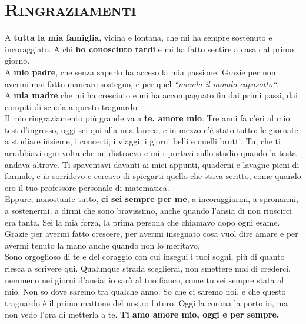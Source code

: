 \chapter*{\scshape Ringraziamenti}

\noindent A \textbf{tutta la mia famiglia}, vicina e lontana, che mi ha sempre sostenuto e incoraggiato. A chi \textbf{ho conosciuto tardi} e mi ha fatto sentire a casa dal primo giorno.\\

\medskip
\noindent A \textbf{mio padre}, che senza saperlo ha acceso la mia passione. Grazie per non avermi mai fatto mancare sostegno, e per quel \textit{``manda il mondo capasotto``}.\\

\medskip
\noindent A \textbf{mia madre} che mi ha cresciuto e mi ha accompagnato fin dai primi passi, dai compiti di scuola a questo traguardo.  \\

\medskip
\noindent Il mio ringraziamento più grande va a \textbf{te, amore mio}. Tre anni fa c'eri al mio test d'ingresso, oggi sei qui alla mia laurea, e in mezzo c'è stato tutto: le giornate a studiare insieme, i concerti, i viaggi, i giorni belli e quelli brutti. Tu, che ti arrabbiavi ogni volta che mi distraevo e mi riportavi sullo studio quando la testa andava altrove.
Ti spaventavi davanti ai miei appunti, quaderni e lavagne pieni di formule, e io sorridevo e cercavo di spiegarti quello che stava scritto, come quando ero il tuo professore personale di matematica.\\
Eppure, nonostante tutto, \textbf{ci sei sempre per me}, a incoraggiarmi, a spronarmi, a sostenermi, a dirmi che sono bravissimo, anche quando l'ansia di non riuscirci era tanta. Sei la mia forza, la prima persona che chiamavo dopo ogni esame. \\
Grazie per avermi fatto crescere, per avermi insegnato cosa vuol dire amare e per avermi tenuto la mano anche quando non lo meritavo. \\
Sono orgoglioso di te e del coraggio con cui insegui i tuoi sogni, più di quanto riesca a scrivere qui. 
Qualunque strada sceglierai, non smettere mai di crederci, nemmeno nei giorni d'ansia: io sarò al tuo fianco, come tu sei sempre stata al mio.
Non so dove saremo tra qualche anno. So che ci saremo noi, e che questo traguardo è il primo mattone del nostro futuro.
Oggi la corona la porto io, ma non vedo l'ora di metterla a te. \textbf{Ti amo amore mio, oggi e per sempre.}\\
\medskip

